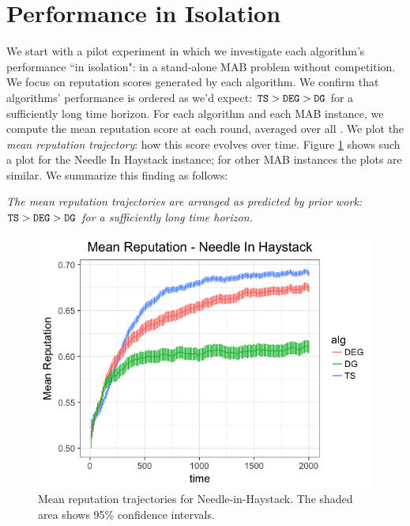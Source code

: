 \documentclass[../competing_bandits.tex]{subfiles}
\begin{document}
\section{Performance in Isolation}\label{sec:isolation}

We start with a pilot experiment in which we investigate each algorithm's performance ``in isolation": in a stand-alone MAB problem without competition. We focus on reputation scores generated by each algorithm. We confirm that algorithms' performance is ordered as we'd expect:
    $\mathtt{TS} > \mathtt{DEG} > \mathtt{DG}$
for a sufficiently long time horizon. For each algorithm and each MAB instance, we compute the mean reputation score at each round, averaged over all \MRVs. We plot the \emph{mean reputation trajectory}: how this score evolves over time. Figure \ref{prelim_means} shows such a plot for the Needle In Haystack instance; for other MAB instances the plots are similar. We summarize this finding as follows:

\begin{finding}
\textit{The mean reputation trajectories are arranged as predicted by prior work:
    $\mathtt{TS} > \mathtt{DEG} > \mathtt{DG}$ for a sufficiently long time horizon.}
\end{finding}


\begin{figure}
\includegraphics[scale=0.35]{figures/nih_iso_mean}
\caption{Mean reputation trajectories for Needle-in-Haystack. The shaded area shows 95\% confidence intervals.}
\label{prelim_means}
\end{figure}
\end{document}
